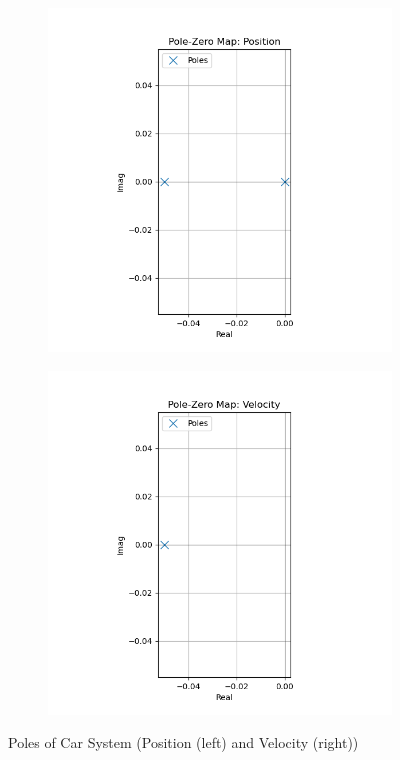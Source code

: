 \begin{figure}[H]
\centering
\begin{subfigure}[b]{0.48\textwidth}
\centering
\includegraphics[width=\linewidth]{Figures/car_position_poles.png}
\end{subfigure}
\hfill
\begin{subfigure}[b]{0.48\textwidth}
\centering
\includegraphics[width=\linewidth]{Figures/car_velocity_poles.png}
\end{subfigure}
\caption{Poles of Car System (Position (left) and Velocity (right))}
\label{f:car_poles}
\end{figure}
